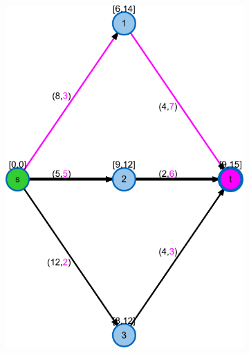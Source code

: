 \begin{figure}
\centering
\begin{subfigure}[t]{0.45\textwidth}
\includegraphics[width=\textwidth]{fig/spp-rc-graph-algorithm-graph}
\end{subfigure}
\begin{subfigure}[t]{0.45\textwidth}

\end{subfigure}
\end{figure}
